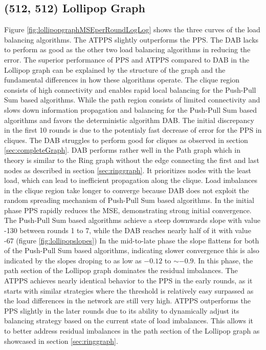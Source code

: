 \subsection{(512, 512) Lollipop Graph}
Figure \ref{fig:lollipopgraphMSEperRoundLogLog} shows the three curves of the load balancing algorithms. The ATPPS slightly outperforms the PPS. The DAB lacks to perform as good as the other two load balancing algorithms in reducing the error. The superior performance of PPS and ATPPS compared to DAB in the Lollipop graph can be explained by the structure of the graph and the fundamental differences in how these algorithms operate. The clique region consists of high connectivity and enables rapid local balancing for the  Push-Pull Sum based algorithms. While the path region consists of limited connectivity and slows down information propagation and balancing for the Push-Pull Sum based algorithms and favors the deterministic algorithm DAB. The initial discrepancy in the first 10 rounds is due to the potentialy fast decrease of error for the PPS in cliques. The DAB struggles to perform good for cliques as observed in section \ref{sec:completeGraph}. DAB performs rather well in the Path graph which in theory is similar to the Ring graph without the edge connecting the first and last nodes as described in section \ref{sec:ringgraph}. It prioritizes nodes with the least load, which can lead to inefficient propagation along the clique. Load imbalances in the clique region take longer to converge because DAB does not exploit the random spreading mechanism of Push-Pull Sum based algorithms. In the initial phase PPS rapidly reduces the MSE, demonstrating strong initial convergence. The Push-Pull Sum based algorithms achieve a steep downwards slope with value -130 between rounds 1 to 7, while the DAB reaches nearly half of it with value -67 (figure \ref{fig:lollipopslopes}) In the mid-to-late phase the slope flattens for both of the Push-Pull Sum based algorithms, indicating slower convergence this is also indicated by the slopes droping to as low as $-0.12$ to $\sim-0.9$. In this phase, the path section of the Lollipop graph dominates the residual imbalances. The ATPPS achieves nearly identical behavior to the PPS in the early rounds, as it starts with similar strategies where the threshold is relatively easy surpassed as the load differences in the network are still very high. ATPPS outperforms the PPS slightly in the later rounds due to its ability to dynamically adjust its balancing strategy based on the current state of load imbalances. This allows it to better address residual imbalances in the path section of the Lollipop graph as showcased in section \ref{sec:ringgraph}.

